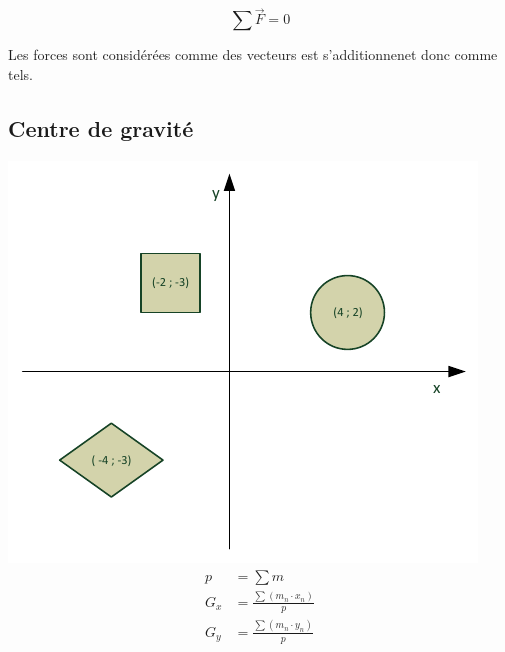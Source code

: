 \documentclass[12pt,a4paper]{article} %
\begin{document}
	$$\sum \vec{F} = 0$$

Les forces sont considérées comme des vecteurs est s'additionnenet donc comme tels.

\subsection{Centre de gravité}

\newcommand\fcount[1]{\text{nombre de}\left(#1\right)}

\begin{twocols}[0.5][0.5]
	\includegraphics{Statique-CentreGravite}
\nextcol
	\begin{align*}
		p &= \sum m \\[1em]
		G_x &= \frac{\sum\left(m_n \cdot x_n\right)}{p} \\[1em]
		G_y &= \frac{\sum\left(m_n \cdot y_n\right)}{p} \\
	\end{align*}
\end{twocols}
\end{document}
